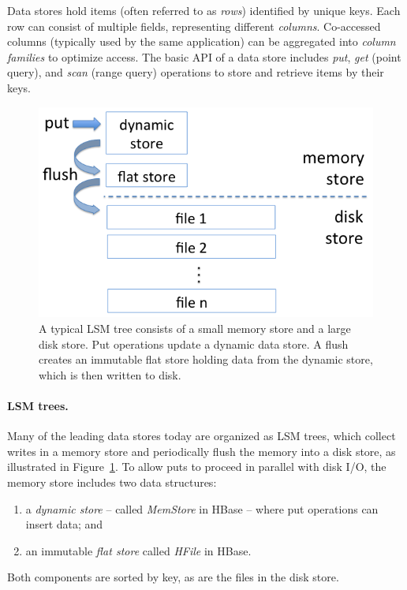 
Data stores hold items (often referred to as \emph{rows})
identified by unique keys. Each row can consist of multiple fields, representing different \emph{columns}.
Co-accessed columns (typically used by the same application) can be aggregated
into  \emph{column families} to optimize access.
The basic API of a data store includes \emph{put}, \emph{get} (point query), and \emph{scan} (range query) 
operations to store and retrieve items by their keys.

\begin{figure}[tbh]
\center
\includegraphics[width=0.85\columnwidth]{LSM} 
\caption{A typical LSM tree consists of a small memory store and a large disk store. 
Put operations update a dynamic data store. A flush creates an immutable flat store  holding 
data from the dynamic store, which is then written to disk.}
\label{fig:LSM}
\end{figure}

\paragraph{LSM trees.}
Many of the leading data stores today are organized as LSM trees, which collect writes in a memory store 
and periodically flush the memory into a disk store, as illustrated in Figure~\ref{fig:LSM}. 
To allow puts to proceed in parallel with disk I/O, the memory store includes two data structures:
\begin{enumerate}
\item
a \emph{dynamic store} -- called \emph{MemStore} in HBase -- where put operations can insert data; and  
\item
an immutable \emph{flat store} called \emph{HFile} in HBase.
\end{enumerate}
Both components are sorted by key, as are the files in the disk store. 

